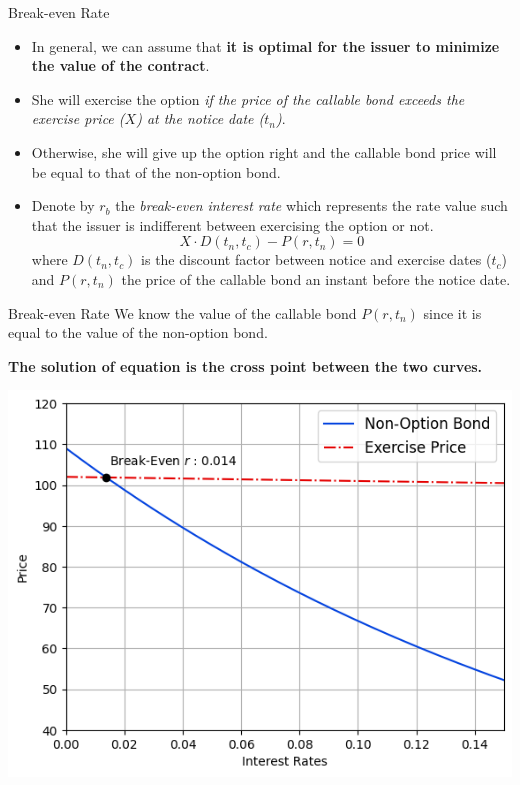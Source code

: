 \documentclass{beamer}
\begin{document}
\begin{frame}{Break-even Rate}
\begin{itemize}
\item In general, we can assume that \textbf{it is optimal for the issuer to minimize the value of the contract}.
\item She will exercise the option \emph{if the price of the callable bond exceeds the exercise price ($X$) at the notice date ($t_n$)}. 
\item Otherwise, she will give up the option right and the callable bond price will be equal to that of the non-option bond.
\item Denote by $r_b$ the \emph{break-even interest rate} which represents the rate value such that the issuer is indifferent between exercising the option or not.
\begin{equation}
X\cdot D(t_n, t_c) - P(r,t_n)=0    
\end{equation}
where $D(t_n, t_c)$ is the discount factor between notice and exercise dates ($t_c$) and $P(r,t_n)$ the price of the callable bond an instant before the notice date.
\end{itemize}
\end{frame}

\begin{frame}{Break-even Rate}
We know the value of the callable bond $P(r,t_n)$ since it is equal to the value of the non-option bond. 

\textbf{The solution of equation is the cross point between the two curves.}
\begin{center}
    \includegraphics[width=0.5\linewidth]{images/callable_bond}
\end{center}
\end{frame}
\end{document}
